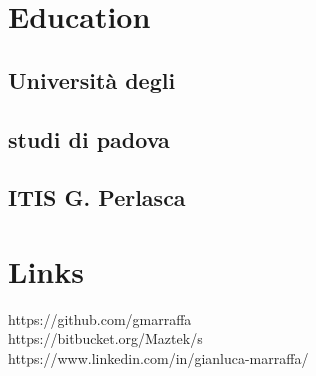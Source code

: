 \documentclass[]{deedy-resume-openfont}
\begin{document}
\begin{minipage}[t]{0.33\textwidth} 


\section{Education} 

\subsection{Università degli}
\subsection{studi di padova}
\sectionsep

\subsection{ITIS G. Perlasca}
\sectionsep


\section{Links} 
https://github.com/gmarraffa \\
https://bitbucket.org/Maztek/s \\
https://www.linkedin.com/in/gianluca-marraffa/ 
\sectionsep



\end{minipage}
\end{document}

